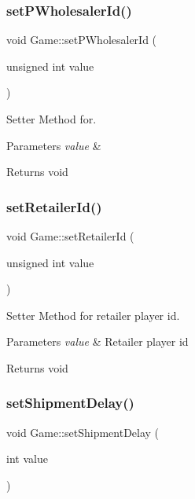 \subsubsection{\texorpdfstring{set\+P\+Wholesaler\+Id()}{setPWholesalerId()}}
{\footnotesize\ttfamily void Game\+::set\+P\+Wholesaler\+Id (\begin{DoxyParamCaption}\item[{unsigned int}]{value }\end{DoxyParamCaption})}



Setter Method for. 


\begin{DoxyParams}{Parameters}
{\em value} & \\
\hline
\end{DoxyParams}
\begin{DoxyReturn}{Returns}
void 
\end{DoxyReturn}
\mbox{\label{classGame_a676c213e382f1b539ac0a3fc56d8d744}} 
\subsubsection{\texorpdfstring{set\+Retailer\+Id()}{setRetailerId()}}
{\footnotesize\ttfamily void Game\+::set\+Retailer\+Id (\begin{DoxyParamCaption}\item[{unsigned int}]{value }\end{DoxyParamCaption})}



Setter Method for retailer player id. 


\begin{DoxyParams}{Parameters}
{\em value} & Retailer player id \\
\hline
\end{DoxyParams}
\begin{DoxyReturn}{Returns}
void 
\end{DoxyReturn}
\mbox{\label{classGame_ae0d4d73857961a54af6d17b055598d11}} 
\subsubsection{\texorpdfstring{set\+Shipment\+Delay()}{setShipmentDelay()}}
{\footnotesize\ttfamily void Game\+::set\+Shipment\+Delay (\begin{DoxyParamCaption}\item[{int}]{value }\end{DoxyParamCaption})}



